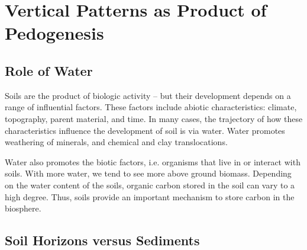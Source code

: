 \section{Vertical Patterns as Product of Pedogenesis}

\subsection{Role of Water}

Soils are the product of biologic activity -- but their development depends on a range of influential factors. These factors include abiotic characteristics: climate, topography, parent material, and time. In many cases, the trajectory of how these characteristics influence the development of soil is via water. Water promotes weathering of minerals, and chemical and clay translocations. 

Water also promotes the biotic factors, i.e. organisms that live in or interact with soils. With more water, we tend to see more above ground biomass. Depending on the water content of the soils, organic carbon stored in the soil can vary to a high degree.  Thus, soils provide an important mechanism to store carbon in the biosphere. 






\subsection{Soil Horizons versus Sediments}

